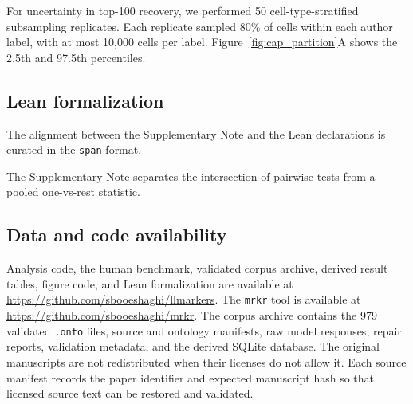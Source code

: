 \documentclass[10pt,twocolumn]{article}
\theoremstyle{plain}
\theoremstyle{definition}
\theoremstyle{remark}
\begin{document}
For uncertainty in top-100 recovery, we performed 50 cell-type-stratified subsampling replicates. Each replicate sampled 80\% of cells within each author label, with at most 10{,}000 cells per label. Figure~\ref{fig:cap_partition}A shows the 2.5th and 97.5th percentiles.

\subsection{Lean formalization}

 The alignment between the Supplementary Note and the Lean declarations is curated in the \texttt{span} format.

 The Supplementary Note separates the intersection of pairwise tests from a pooled one-vs-rest statistic.

\subsection{Data and code availability}

Analysis code, the human benchmark, validated corpus archive, derived result tables, figure code, and Lean formalization are available at \url{https://github.com/sbooeshaghi/llmarkers}. The \texttt{mrkr} tool is available at \url{https://github.com/sbooeshaghi/mrkr}. The corpus archive contains the 979 validated \texttt{.onto} files, source and ontology manifests, raw model responses, repair reports, validation metadata, and the derived SQLite database. The original manuscripts are not redistributed when their licenses do not allow it. Each source manifest records the paper identifier and expected manuscript hash so that licensed source text can be restored and validated.
\end{document}
